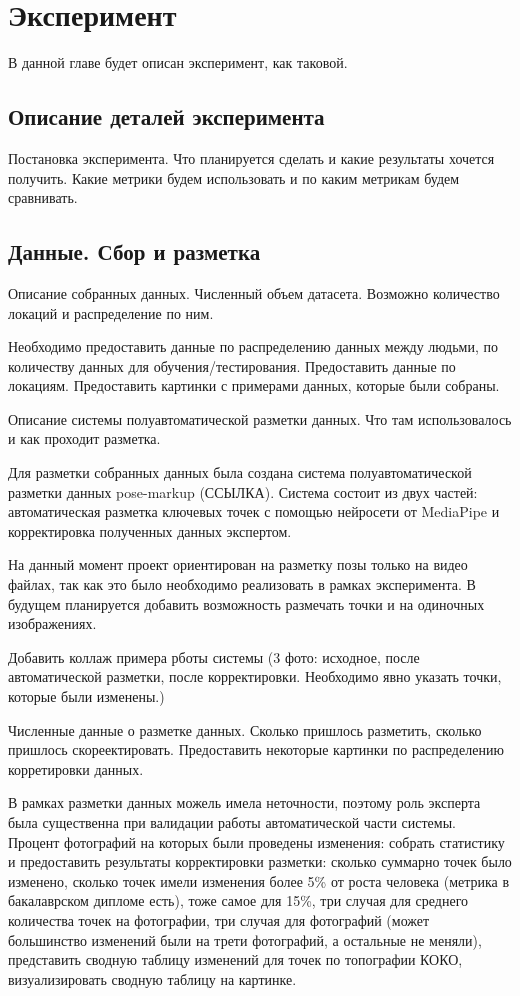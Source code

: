 \section{Эксперимент}
\label{sec:Chapter5} 

В данной главе будет описан эксперимент, как таковой.

\subsection{Описание деталей эксперимента}

Постановка эксперимента. Что планируется сделать и какие результаты хочется получить. Какие метрики будем использовать и по каким метрикам будем сравнивать.

\subsection{Данные. Сбор и разметка}

Описание собранных данных. Численный объем датасета. Возможно количество локаций и распределение по ним.

Необходимо предоставить данные по распределению данных между людьми, по количеству данных для обучения/тестирования. Предоставить данные по локациям. Предоставить картинки с примерами данных, которые были собраны.

Описание системы полуавтоматической разметки данных. Что там использовалось и как проходит разметка.

Для разметки собранных данных была создана система полуавтоматической разметки данных pose-markup (ССЫЛКА). Система состоит из двух частей: автоматическая разметка ключевых точек с помощью нейросети от MediaPipe и корректировка полученных данных экспертом.

На данный момент проект ориентирован на разметку позы только на видео файлах, так как это было необходимо реализовать в рамках эксперимента. В будущем планируется добавить возможность размечать точки и на одиночных изображениях.

Добавить коллаж примера рботы системы (3 фото: исходное, после автоматической разметки, после корректировки. Необходимо явно указать точки, которые были изменены.)

Численные данные о разметке данных. Сколько пришлось разметить, сколько пришлось скореектировать. Предоставить некоторые картинки по распределению корретировки данных.

В рамках разметки данных можель имела неточности, поэтому роль эксперта была существенна при валидации работы автоматической части системы. Процент фотографий на которых были проведены изменения: собрать статистику и предоставить результаты корректировки разметки: сколько суммарно точек было изменено, сколько точек имели изменения более 5\% от роста человека (метрика в бакалаврском дипломе есть), тоже самое для 15\%, три случая для среднего количества точек на фотографии, три случая для фотографий (может большинство изменений были на трети фотографий, а остальные не меняли), представить сводную таблицу изменений для точек по топографии КОКО, визуализировать сводную таблицу на картинке. 

